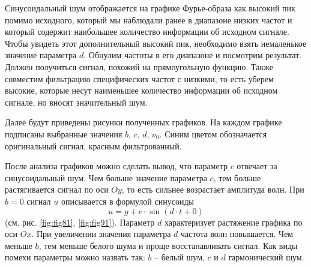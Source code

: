 \documentclass[a4paper, 12pt]{article}
\begin{document}
    Синусоидальный шум отображается на графике Фурье-образа как высокий пик помимо исходного, который мы наблюдали ранее в диапазоне низких частот
    и который содержит наибольшее количество информации об исходном сигнале. Чтобы увидеть этот дополнительный высокий пик, необходимо взять немаленькое значение параметра $d$.
    Обнулим частоты в его диапазоне и посмотрим результат. Должен
    получиться сигнал, похожий на прямоугольную функцию. Также совместим фильтрацию специфических частот с низкими, то есть уберем высокие, которые
    несут наименьшее количество информации об исходном сигнале, но вносят значительный шум.


    Далее будут приведены рисунки полученных графиков. На каждом графике подписаны выбранные значения $b,\,c,\,d,\,\nu_0$. 
    Синим цветом обозначается оригинальный сигнал, красным фильтрованный. 




    После анализа графиков можно сделать вывод, что параметр $c$ отвечает за синусоидальный шум. Чем больше значение параметра $c$,
    тем больше растягивается сигнал по оси $Oy$, то есть сильнее возрастает амплитуда волн. При $b=0$ сигнал $u$ описывается
    в формулой синусоиды $$u=g+c\cdot\sin{(d\cdot t+0)}$$ (см. рис. \ref{fig:fig81}, \ref{fig:fig91}).
    Параметр $d$ характеризует растяжение графика по оси $Ox$. При увеличении значения параметра $d$ частота волн повышается.
    Чем меньше $b$, тем меньше белого шума и проще восстанавливать сигнал.
    Как виды помехи параметры можно назвать так: $b$ -- белый шум, $c \text{ и } d$ гармонический шум.
   
\end{document}
